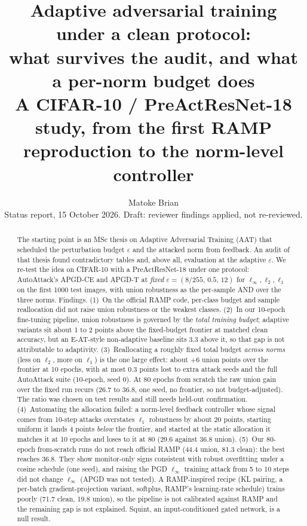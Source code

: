 \documentclass[11pt]{article}
\title{Adaptive adversarial training under a clean protocol:\\
what survives the audit, and what a per-norm budget does\\
\large A CIFAR-10 / PreActResNet-18 study, from the first RAMP reproduction to the norm-level controller}
\author{Matoke Brian\\\small Status report, 15 October 2026. Draft: reviewer findings applied, not re-reviewed.}
\date{}
\begin{document}
\maketitle

\begin{abstract}
The starting point is an MSc thesis on Adaptive Adversarial Training (AAT) that scheduled the perturbation budget $\varepsilon$ and the
attacked norm from feedback. An audit of that thesis found contradictory tables and, above all, evaluation at the adaptive $\varepsilon$.
We re-test the idea on CIFAR-10 with a PreActResNet-18 under one protocol: AutoAttack's APGD-CE and APGD-T at \emph{fixed}
$\varepsilon=(8/255,\,0.5,\,12)$ for $\ell_\infty,\ell_2,\ell_1$ on the first 1000 test images, with union robustness as the per-sample AND over the three norms.
Findings. (1)~On the official RAMP code, per-class budget and sample reallocation did not raise union robustness or the weakest classes.
(2)~In our 10-epoch fine-tuning pipeline, union robustness is governed by the \emph{total training budget}; adaptive variants sit about 1 to 2 points above the
fixed-budget frontier at matched clean accuracy, but an E-AT-style non-adaptive baseline sits 3.3 above it, so that gap is not attributable to adaptivity.
(3)~Reallocating a roughly fixed total budget \emph{across norms} (less on $\ell_2$, more on $\ell_1$) is the one large effect: about $+6$ union points over the frontier
at 10 epochs, with at most 0.3 points lost to extra attack seeds and the full AutoAttack suite (10-epoch, seed 0). At 80 epochs from scratch the raw union gain over the fixed run recurs (26.7 to 36.8, one seed, no frontier, so not budget-adjusted).
The ratio was chosen on test results and still needs held-out confirmation.
(4)~Automating the allocation failed: a norm-level feedback controller whose signal comes from 10-step attacks overstates $\ell_1$ robustness by about 20 points, starting uniform it lands 4 points \emph{below} the frontier,
and started at the static allocation it matches it at 10 epochs and loses to it at 80 (29.6 against 36.8 union).
(5)~Our 80-epoch from-scratch runs do not reach official RAMP (44.4 union, 81.3 clean): the best reaches 36.8. They show monitor-only signs consistent with robust overfitting under a cosine schedule (one seed), and raising the PGD $\ell_\infty$ training attack from 5 to 10 steps did not change $\ell_\infty$ (APGD was not tested).
A RAMP-inspired recipe (KL pairing, a per-batch gradient-projection variant, softplus, RAMP's learning-rate schedule) trains poorly (71.7 clean, 19.8 union), so the pipeline is not calibrated against RAMP and the remaining gap is not explained.
Squint, an input-conditioned gated network, is a null result.
\end{abstract}
\end{document}
